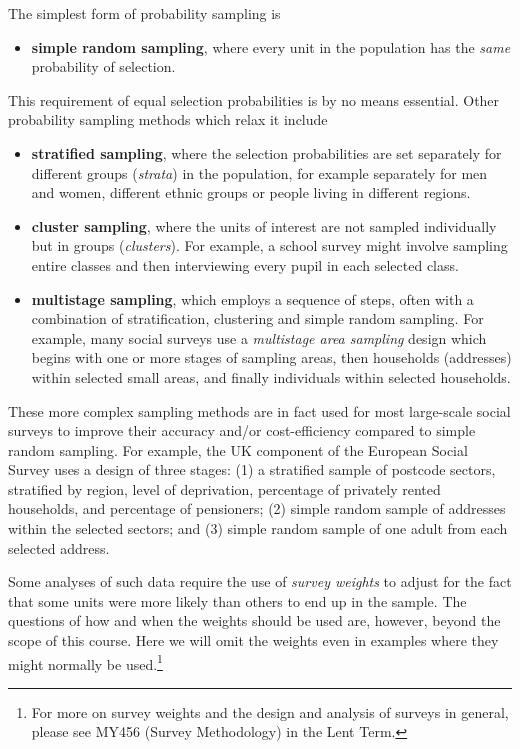 The simplest form of probability sampling is
\begin{itemize}
\item
\textbf{simple random sampling}, where every unit in the population has
the \emph{same} probability of selection.
\end{itemize}
This requirement of equal selection probabilities is by no means
essential. Other probability sampling methods which relax it include
\begin{itemize}
\item
\textbf{stratified sampling}, where the selection probabilities are set
separately for different groups (\emph{strata})
in the population, for example separately for men and women, different
ethnic groups or people living in different regions.
\item
\textbf{cluster sampling}, where the units of interest
are not sampled individually but in groups (\emph{clusters}).
For example, a school survey
might involve sampling entire classes and then interviewing every pupil
in each selected class.
\item
\textbf{multistage sampling}, which employs a sequence of steps,
often with a combination of stratification, clustering and simple
random sampling. For example, many social surveys use a \emph{multistage
area sampling} design which begins with one or more stages of sampling
areas, then households (addresses) within selected small areas, and
finally individuals within selected households.
\end{itemize}
These more complex sampling methods are in fact used for most
large-scale social surveys to improve their accuracy and/or
cost-efficiency compared to simple random sampling. For example, the UK
component of the European Social Survey uses a design of three stages:
(1) a stratified sample of postcode sectors, stratified by region, level
of deprivation, percentage of privately rented households, and
percentage of pensioners; (2) simple random sample of addresses within
the selected sectors; and (3) simple random sample of one adult from
each selected address.

Some analyses of such data require the use of \emph{survey weights} to
adjust for the fact that some units were more likely than
others to end up in the sample. The questions of how and when the
weights should be used are, however, beyond the scope of this course.
Here we will omit the weights even in examples where they might normally
be used.\footnote{For more on survey weights and the design and analysis
of surveys in general, please see MY456 (Survey Methodology) in the Lent
Term.}


